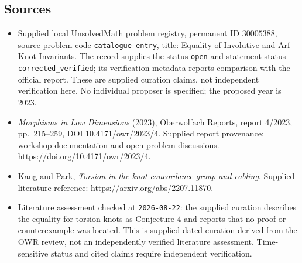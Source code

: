 \documentclass[11pt]{article}
\begin{document}
\subsection{Sources}
\begin{itemize}
\item Supplied local UnsolvedMath problem registry, permanent ID \(30005388\), source problem code \texttt{catalogue entry}, title: Equality of Involutive and Arf Knot Invariants. The record supplies the status \texttt{open} and statement status \texttt{corrected\_verified}; its verification metadata reports comparison with the official report. These are supplied curation claims, not independent verification here. No individual proposer is specified; the proposed year is 2023.
\item \emph{Morphisms in Low Dimensions} (2023), Oberwolfach Reports, report 4/2023, pp.\ 215--259, DOI 10.4171/owr/2023/4. Supplied report provenance: workshop documentation and open-problem discussions. \url{https://doi.org/10.4171/owr/2023/4}.
\item Kang and Park, \emph{Torsion in the knot concordance group and cabling}. Supplied literature reference: \url{https://arxiv.org/abs/2207.11870}.
\item Literature assessment checked at \texttt{2026-08-22}: the supplied curation describes the equality for torsion knots as Conjecture 4 and reports that no proof or counterexample was located. This is supplied dated curation derived from the OWR review, not an independently verified literature assessment. Time-sensitive status and cited claims require independent verification.
\end{itemize}
\end{document}
